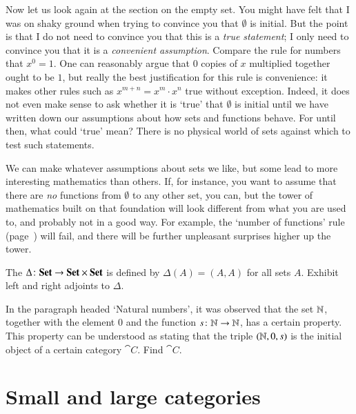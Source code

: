Now let us look again at the section on the empty%
%
%
set.  You might have felt that I was on shaky ground when trying to
convince you that $\emptyset$ is initial.  But the point is that I do not
need to convince you that this is a \emph{true statement}; I only need to
convince you that it is a \emph{convenient assumption}.  Compare the rule
for numbers that $x^0 = 1$.  One can reasonably argue that $0$ copies of
$x$ multiplied together ought to be $1$, but really the best justification
for this rule is convenience: it makes other rules such as $x^{m + n} = x^m
\cdot x^n$ true without exception.  Indeed, it does not even make sense to
ask whether it is `true' that $\emptyset$ is initial until we have written
down our assumptions about how sets and functions behave.  For until then,
what could `true' mean?  There is no physical world of sets against which
to test such statements.

We can make whatever assumptions about sets we like, but some lead to more
interesting mathematics than others.  If, for instance, you want to assume
that there are \emph{no} functions from $\emptyset$ to any other set, you
can, but the tower of mathematics built on that foundation will look
different from what you are used to, and probably not in a good way.  For
example, the `number of functions' rule (page~\pageref{p:num-fns}) will
fail, and there will be further unpleasant surprises higher up the tower.%
%
%
%
%

\exs


\begin{question}        
\label{ex:diagonal-Set}
The  $\Delta\from \Set \to \Set \times \Set$%
%
%
is defined by $\Delta(A) = (A, A)$ for all sets $A$.  Exhibit left and
right adjoints to $\Delta$.
\end{question}


\begin{question}        
\label{ex:nno}
In the paragraph headed `Natural numbers', it was observed that the set
$\mathbb{N}$, together with the element $0$ and the function $s\from \nat \to
\nat$, has a certain property.  This property can be understood as stating
that the triple $(\mathbb{N}, 0, s)$ is the initial object of a certain category
$\cat{C}$.  Find $\cat{C}$.
\end{question}



\section{Small and large categories}
\label{sec:small-large}


